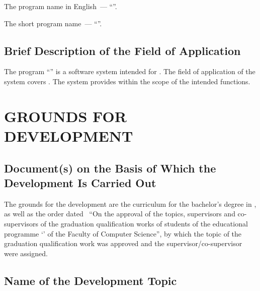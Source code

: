 \documentclass[12pt,a4paper]{extarticle}
\begin{document}
The program name in English~--- \enquote{\hseProjectNameEn}.

The short program name~--- \enquote{\hseProjectNameShort}.

\subsection{Brief Description of the Field of Application}

The program \enquote{\projectname} is a software system intended for . The field of application of the system covers . The system provides  within the scope of the intended functions.

\clearpage

\section{GROUNDS FOR DEVELOPMENT}

\subsection{Document(s) on the Basis of Which the Development Is Carried Out}

The grounds for the development are the curriculum for the bachelor's degree in , as well as the order dated~ \enquote{On the approval of the topics, supervisors and co-supervisors of the graduation qualification works of students of the educational programme \enquote{\hseSpecialization} of the Faculty of Computer Science}, by which the topic of the graduation qualification work was approved and the supervisor/co-supervisor were assigned.

\subsection{Name of the Development Topic}
\end{document}
